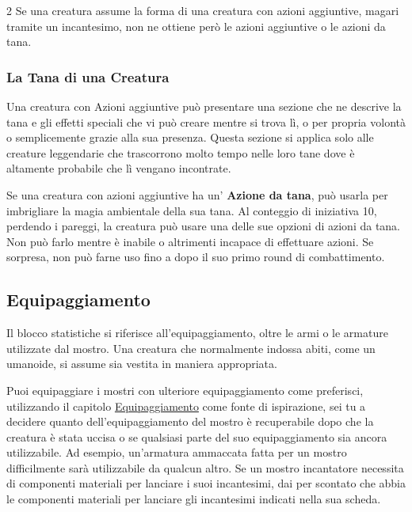 \begin{multicols}{2}
Se una creatura assume la forma di una creatura con azioni aggiuntive, magari tramite un incantesimo, non ne ottiene però le azioni aggiuntive o le azioni da tana.

\subsubsection{La Tana di una Creatura}

Una creatura con Azioni aggiuntive può presentare una sezione che ne descrive la tana e gli effetti speciali che vi può creare mentre si trova lì, o per propria volontà o semplicemente grazie alla sua presenza. Questa sezione si applica solo alle creature leggendarie che trascorrono molto tempo nelle loro tane dove è altamente probabile che lì vengano incontrate.

Se una creatura con azioni aggiuntive ha un' \textbf{Azione da tana}, può usarla per imbrigliare la magia ambientale della sua tana. Al conteggio di iniziativa 10, perdendo i pareggi, la creatura può usare una delle sue opzioni di azioni da tana. Non può farlo mentre è inabile o altrimenti incapace di effettuare azioni. Se sorpresa, non può farne uso fino a dopo il suo primo round di combattimento.




\subsection{Equipaggiamento}

Il blocco statistiche si riferisce all'equipaggiamento, oltre le armi o le armature utilizzate dal mostro. Una creatura che normalmente indossa abiti, come un umanoide, si assume sia vestita in maniera appropriata.

Puoi equipaggiare i mostri con ulteriore equipaggiamento come preferisci, utilizzando il capitolo \hyperlink{equipaggiamento}{Equipaggiamento} come fonte di ispirazione, sei tu a decidere quanto dell'equipaggiamento del mostro è recuperabile dopo che la creatura è stata uccisa o se qualsiasi parte del suo equipaggiamento sia ancora utilizzabile. Ad esempio, un'armatura ammaccata fatta per un mostro difficilmente sarà utilizzabile da qualcun altro. Se un mostro incantatore necessita di componenti materiali per lanciare i suoi incantesimi, dai per scontato che abbia le componenti materiali per lanciare gli incantesimi indicati nella sua scheda.



\end{multicols}
